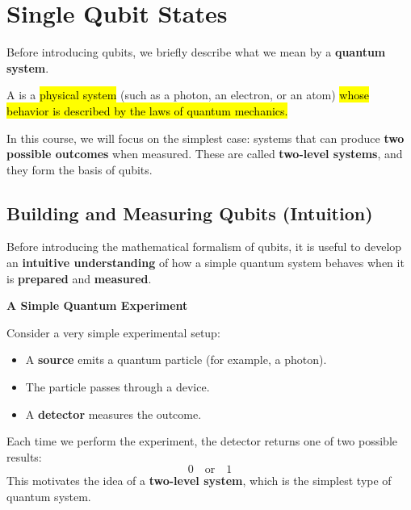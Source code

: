 \section{Single Qubit States}

Before introducing qubits, we briefly describe what we mean by a \textbf{quantum system}.

\highspace
A  is a \hl{physical system} (such as a photon, an electron, or an atom) \hl{whose behavior is described by the laws of quantum mechanics.}

\highspace
In this course, we will focus on the simplest case: systems that can produce \textbf{two possible outcomes} when measured. These are called \textbf{two-level systems}, and they form the basis of qubits.

\longline

\subsection{Building and Measuring Qubits (Intuition)}

Before introducing the mathematical formalism of qubits, it is useful to develop an \textbf{intuitive understanding} of how a simple quantum system behaves when it is \textbf{prepared} and \textbf{measured}.

\highspace
\begin{flushleft}
    \textcolor{Green3}{ \textbf{A Simple Quantum Experiment}}
\end{flushleft}
Consider a very simple experimental setup:
\begin{itemize}
    \item A \textbf{source} emits a quantum particle (for example, a photon).
    \item The particle passes through a device.
    \item A \textbf{detector} measures the outcome.
\end{itemize}
Each time we perform the experiment, the detector returns one of two possible results:
\begin{equation*}
    0 \quad \text{or} \quad 1
\end{equation*}
This motivates the idea of a \textbf{two-level system}, which is the simplest type of quantum system.

